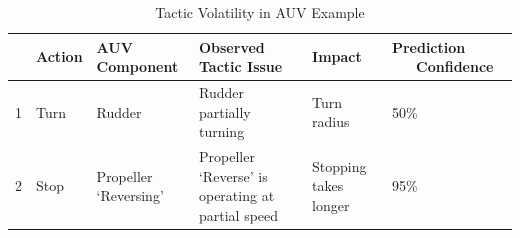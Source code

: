 \documentclass[12pt]{article}
\begin{document}



\begin{table}[h]
\begin{center}
\caption{Tactic Volatility in AUV Example}
\label{table:tacticVolatilityInfo}

\begin{tabular}{ |c|l|l|p{4.18cm}|l|p{2.05cm}| } 
 \hline
 \bfseries & \bfseries Action &  \bfseries AUV Component & \bfseries Observed Tactic Issue & \bfseries Impact & \bfseries Prediction ~~~Confidence  \\ \hline

 1 & Turn & Rudder & Rudder partially turning & Turn radius  & 50\% \\ \hline
 2 & Stop & Propeller `Reversing’ & Propeller `Reverse' is operating at partial speed & Stopping takes longer & 95\% \\ \hline




   \end{tabular}
  \end{center}
\end{table}



\end{document}
